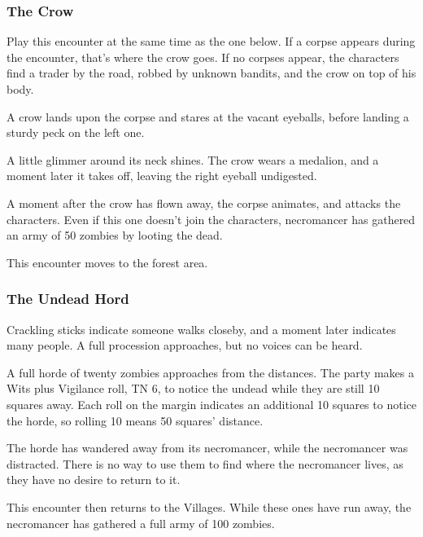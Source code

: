 \subsubsection{The Crow}

Play this encounter at the same time as the one below.  If a corpse appears during the encounter, that's where the crow goes.  If no corpses appear, the characters find a trader by the road, robbed by unknown bandits, and the crow on top of his body.

\begin{boxtext}
	A crow lands upon the corpse and stares at the vacant eyeballs, before landing a sturdy peck on the left one.

	A little glimmer around its neck shines.  The crow wears a medalion, and a moment later it takes off, leaving the right eyeball undigested.

\end{boxtext}

A moment after the crow has flown away, the corpse animates, and attacks the characters.  Even if this one doesn't join the characters, \gls{necromancer} has gathered an army of 50 zombies by looting the dead.

\zombie

This encounter moves to the forest area.

\subsubsection{The Undead Hord}

\begin{boxtext}
	Crackling sticks indicate someone walks closeby, and a moment later indicates many people.  A full procession approaches, but no voices can be heard.
\end{boxtext}

A full horde of twenty zombies approaches from the distances.  The party makes a Wits plus Vigilance roll, TN 6, to notice the undead while they are still 10 squares away.  Each roll on the margin indicates an additional 10 squares to notice the horde, so rolling 10 means 50 squares' distance.

The horde has wandered away from its necromancer, while the necromancer was distracted.  There is no way to use them to find where the necromancer lives, as they have no desire to return to it.

This encounter then returns to the Villages.  While these ones have run away, the necromancer has gathered a full army of 100 zombies.

